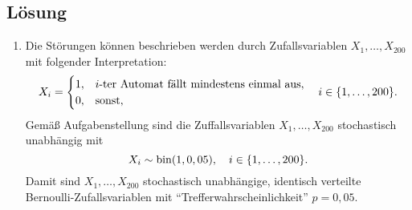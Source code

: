 \documentclass{exercise}
\begin{document}
    \subsection*{Lösung}
    \begin{enumerate}
        \item Die Störungen  können beschrieben werden durch Zufallsvariablen \(X_1, \ldots, X_{200}\) mit folgender Interpretation:
        \[
            X_i = \begin{cases}
                1, & i\text{-ter Automat fällt mindestens einmal aus},\\
                0, & \text{sonst},
            \end{cases} \quad i \in \braces*{1, \ldots, 200}.
        \]
        Gemäß Aufgabenstellung sind die Zuffallsvariablen \(X_1, \ldots, X_{200}\) stochastisch unabhängig mit
        \[
            X_i \sim \bin\parentheses*{1, 0,05}, \quad i \in \braces*{1, \ldots, 200}.
        \]
        Damit sind \(X_1, \ldots, X_{200}\) stochastisch unabhängige, identisch verteilte Bernoulli-Zufallsvariablen mit ``Trefferwahrscheinlichkeit'' \(p = 0,05\).
        

\end{enumerate}
\end{document}

